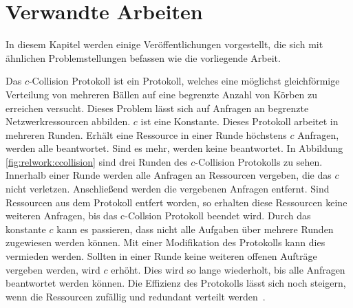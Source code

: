 \chapter{Verwandte Arbeiten}
\label{chap:relwork}
%
In diesem Kapitel werden einige Veröffentlichungen vorgestellt, die sich mit ähnlichen Problemstellungen befassen wie die vorliegende Arbeit.

Das $c$-Collision Protokoll ist ein Protokoll, welches eine möglichst gleichförmige Verteilung von mehreren Bällen auf eine begrenzte Anzahl von Körben zu erreichen versucht. Dieses Problem lässt sich auf Anfragen an begrenzte Netzwerkressourcen abbilden. $c$ ist eine Konstante. Dieses Protokoll arbeitet in mehreren Runden. Erhält eine Ressource in einer Runde höchstens $c$ Anfragen, werden alle beantwortet. Sind es mehr, werden keine beantwortet. In Abbildung \ref{fig:relwork:ccollision} sind drei Runden des $c$-Collision Protokolls zu sehen. Innerhalb einer Runde werden alle Anfragen an Ressourcen vergeben, die das $c$ nicht verletzen. Anschließend werden die vergebenen Anfragen entfernt. Sind Ressourcen aus dem Protokoll entfert worden, so erhalten diese Ressourcen keine weiteren Anfragen, bis das c-Collsion Protokoll beendet wird. Durch das konstante $c$ kann es passieren, dass nicht alle Aufgaben über mehrere Runden zugewiesen werden können. Mit einer Modifikation des Protokolls kann dies vermieden werden. Sollten in einer Runde keine weiteren offenen Aufträge vergeben werden, wird $c$ erhöht. Dies wird so lange wiederholt, bis alle Anfragen beantwortet werden können. Die Effizienz des Protokolls lässt sich noch steigern, wenn die Ressourcen zufällig und redundant verteilt werden~\cite{ccol4}.
